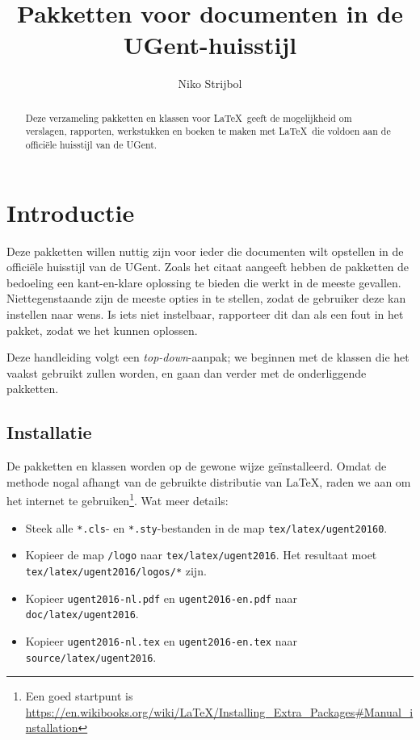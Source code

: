\documentclass[11pt,parskip=half-]{scrartcl}
\title{Pakketten voor documenten in de UGent-huisstijl}
\author{Niko Strijbol}
\begin{document}
    \maketitle

    \begin{abstract}
        \noindent Deze verzameling pakketten en klassen voor \LaTeX\ geeft de mogelijkheid om verslagen, rapporten, werkstukken en boeken te maken met \LaTeX\ die voldoen aan de officiële huisstijl van de UGent.
    \end{abstract}

    \tableofcontents

    \section{Introductie}\label{sec:introductie}


    Deze pakketten willen nuttig zijn voor ieder die documenten wilt opstellen in de officiële huisstijl van de UGent. Zoals het citaat aangeeft hebben de pakketten de bedoeling een kant-en-klare oplossing te bieden die werkt in de meeste gevallen. Niettegenstaande zijn de meeste opties in te stellen, zodat de gebruiker deze kan instellen naar wens. Is iets niet instelbaar, rapporteer dit dan als een fout in het pakket, zodat we het kunnen oplossen.

    Deze handleiding volgt een \emph{top-down}-aanpak; we beginnen met de klassen die het vaakst gebruikt zullen worden, en gaan dan verder met de onderliggende pakketten.

    \subsection{Installatie}\label{subsec:installatie}
    De pakketten en klassen worden op de gewone wijze geïnstalleerd. Omdat de methode nogal afhangt van de gebruikte distributie van \LaTeX, raden we aan om het internet te gebruiken\footnote{Een goed startpunt is \url{https://en.wikibooks.org/wiki/LaTeX/Installing_Extra_Packages\#Manual_installation}}. Wat meer details:

    \begin{itemize}
        \item Steek alle \texttt{*.cls}- en \texttt{*.sty}-bestanden in de map \texttt{tex/latex/ugent20160}.
        \item Kopieer de map \texttt{/logo} naar \texttt{tex/latex/ugent2016}. Het resultaat moet \texttt{tex/latex/ugent2016/logos/*} zijn.
        \item Kopieer \texttt{ugent2016-nl.pdf} en \texttt{ugent2016-en.pdf} naar \texttt{doc/latex/ugent2016}.
        \item Kopieer \texttt{ugent2016-nl.tex} en \texttt{ugent2016-en.tex} naar \texttt{source/latex/ugent2016}.
    \end{itemize}
\end{document}
